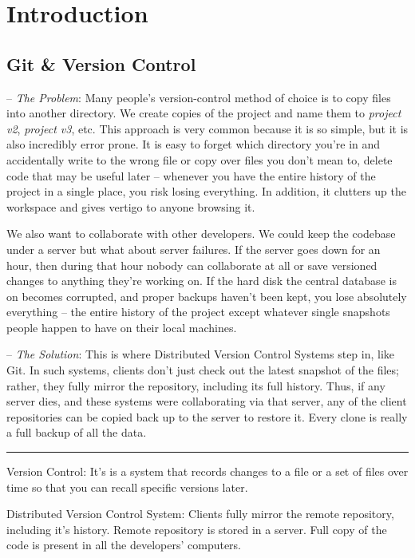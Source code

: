 \documentclass[12pt,a4]{article}
\begin{document}


\section{Introduction}
\subsection{Git \& Version Control}
{\sf -- \emph{The Problem}:}
Many people’s version-control method of choice is to copy files into another
directory. We create copies of the project and name them to \emph{project v2},
\emph{project v3}, etc. This approach is very common because it is so simple,
but it is also incredibly error prone. It is easy to forget which directory
you’re in and accidentally write to the wrong file or copy over files you don’t
mean to, delete code that may be useful later -- whenever you have the entire
history of the project in a single place, you risk losing everything. In
addition, it clutters up the workspace and gives vertigo to anyone browsing it.

We also want to collaborate with other developers. We could keep the codebase
under a server but what about server failures. If the server goes down for an
hour, then during that hour nobody can collaborate at all or save versioned
changes to anything they're working on. If the hard disk the central database is
on becomes corrupted, and proper backups haven’t been kept, you lose absolutely
everything -- the entire history of the project except whatever single snapshots
people happen to have on their local machines.

{\sf -- \emph{The Solution}:} This is where Distributed Version Control Systems
step in, like Git. In such systems, clients don’t just check out the latest
snapshot of the files; rather, they fully mirror the repository, including its
full history. Thus, if any server dies, and these systems were collaborating via
that server, any of the client repositories can be copied back up to the server
to restore it. Every clone is really a full backup of all the data.

\textcolor[RGB]{220,220,220}{\rule{\linewidth}{0.8pt}}

{\sf Version Control:} It's is a system that records changes to a file or a set
of files over time so that you can recall specific versions later.

{\sf Distributed Version Control System:} Clients fully mirror the remote
repository, including it's history. Remote repository is stored in a server.
Full copy of the code is present in all the developers' computers.
\end{document}
